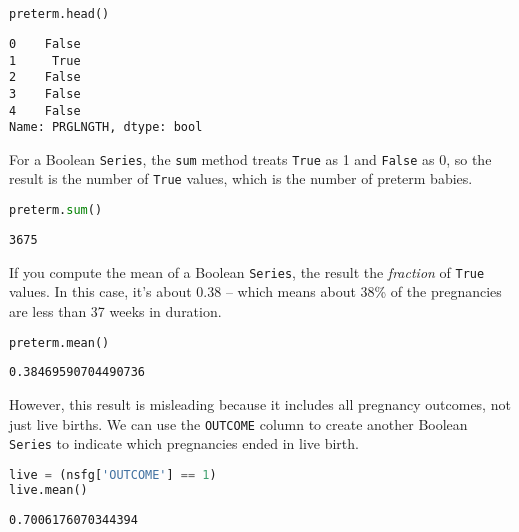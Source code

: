 \begin{lstlisting}[language=Python,style=source]
preterm.head()
\end{lstlisting}

\begin{lstlisting}[style=output]
0    False
1     True
2    False
3    False
4    False
Name: PRGLNGTH, dtype: bool
\end{lstlisting}

For a Boolean \passthrough{\lstinline!Series!}, the
\passthrough{\lstinline!sum!} method treats
\passthrough{\lstinline!True!} as 1 and \passthrough{\lstinline!False!}
as 0, so the result is the number of \passthrough{\lstinline!True!}
values, which is the number of preterm babies.

\begin{lstlisting}[language=Python,style=source]
preterm.sum()
\end{lstlisting}

\begin{lstlisting}[style=output]
3675
\end{lstlisting}

If you compute the mean of a Boolean \passthrough{\lstinline!Series!},
the result the \emph{fraction} of \passthrough{\lstinline!True!} values.
In this case, it's about 0.38 -- which means about 38\% of the
pregnancies are less than 37 weeks in duration.

\begin{lstlisting}[language=Python,style=source]
preterm.mean()
\end{lstlisting}

\begin{lstlisting}[style=output]
0.38469590704490736
\end{lstlisting}

However, this result is misleading because it includes all pregnancy
outcomes, not just live births. We can use the
\passthrough{\lstinline!OUTCOME!} column to create another Boolean
\passthrough{\lstinline!Series!} to indicate which pregnancies ended in
live birth.

\begin{lstlisting}[language=Python,style=source]
live = (nsfg['OUTCOME'] == 1)
live.mean()
\end{lstlisting}

\begin{lstlisting}[style=output]
0.7006176070344394
\end{lstlisting}

